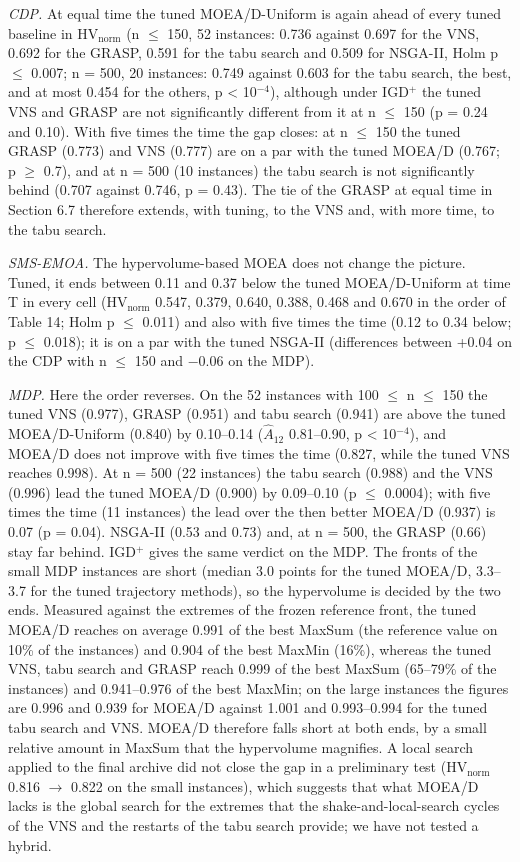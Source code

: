 \emph{CDP.} At equal time the tuned MOEA/D-Uniform is again ahead of every tuned baseline in $\mathrm{HV}_{\mathrm{norm}}$ (n $\leq$ 150, 52 instances: 0.736 against 0.697 for the VNS, 0.692 for the GRASP, 0.591 for the tabu search and 0.509 for NSGA-II, Holm p $\leq$ 0.007; n = 500, 20 instances: 0.749 against 0.603 for the tabu search, the best, and at most 0.454 for the others, p < 10$^{-4}$), although under IGD$^{+}$ the tuned VNS and GRASP are not significantly different from it at n $\leq$ 150 (p = 0.24 and 0.10). With five times the time the gap closes: at n $\leq$ 150 the tuned GRASP (0.773) and VNS (0.777) are on a par with the tuned MOEA/D (0.767; p $\geq$ 0.7), and at n = 500 (10 instances) the tabu search is not significantly behind (0.707 against 0.746, p = 0.43). The tie of the GRASP at equal time in Section 6.7 therefore extends, with tuning, to the VNS and, with more time, to the tabu search.

\emph{SMS-EMOA.} The hypervolume-based MOEA does not change the picture. Tuned, it ends between 0.11 and 0.37 below the tuned MOEA/D-Uniform at time T in every cell ($\mathrm{HV}_{\mathrm{norm}}$ 0.547, 0.379, 0.640, 0.388, 0.468 and 0.670 in the order of Table 14; Holm p $\leq$ 0.011) and also with five times the time (0.12 to 0.34 below; p $\leq$ 0.018); it is on a par with the tuned NSGA-II (differences between +0.04 on the CDP with n $\leq$ 150 and $-$0.06 on the MDP).

\emph{MDP.} Here the order reverses. On the 52 instances with 100 $\leq$ n $\leq$ 150 the tuned VNS (0.977), GRASP (0.951) and tabu search (0.941) are above the tuned MOEA/D-Uniform (0.840) by 0.10--0.14 ($\hat{A}_{12}$ 0.81--0.90, p < 10$^{-4}$), and MOEA/D does not improve with five times the time (0.827, while the tuned VNS reaches 0.998). At n = 500 (22 instances) the tabu search (0.988) and the VNS (0.996) lead the tuned MOEA/D (0.900) by 0.09--0.10 (p $\leq$ 0.0004); with five times the time (11 instances) the lead over the then better MOEA/D (0.937) is 0.07 (p = 0.04). NSGA-II (0.53 and 0.73) and, at n = 500, the GRASP (0.66) stay far behind. IGD$^{+}$ gives the same verdict on the MDP. The fronts of the small MDP instances are short (median 3.0 points for the tuned MOEA/D, 3.3--3.7 for the tuned trajectory methods), so the hypervolume is decided by the two ends. Measured against the extremes of the frozen reference front, the tuned MOEA/D reaches on average 0.991 of the best MaxSum (the reference value on 10\% of the instances) and 0.904 of the best MaxMin (16\%), whereas the tuned VNS, tabu search and GRASP reach 0.999 of the best MaxSum (65--79\% of the instances) and 0.941--0.976 of the best MaxMin; on the large instances the figures are 0.996 and 0.939 for MOEA/D against 1.001 and 0.993--0.994 for the tuned tabu search and VNS. MOEA/D therefore falls short at both ends, by a small relative amount in MaxSum that the hypervolume magnifies. A local search applied to the final archive did not close the gap in a preliminary test ($\mathrm{HV}_{\mathrm{norm}}$ 0.816 $\rightarrow$ 0.822 on the small instances), which suggests that what MOEA/D lacks is the global search for the extremes that the shake-and-local-search cycles of the VNS and the restarts of the tabu search provide; we have not tested a hybrid.

